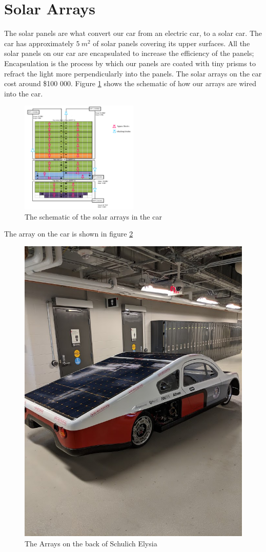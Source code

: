 \documentclass[titlepage]{article}
\begin{document}
    \section{Solar Arrays}
    The solar panels are what convert our car from an electric car, to a
    solar car. The car has approximately $5\ m^2$ of solar panels
    covering its upper surfaces. All the solar panels on our car are
    encapsulated to increase the efficiency of the panels; Encapsulation
    is the process by which our panels are coated with tiny prisms to
    refract the light more perpendicularly into the panels. The solar
    arrays on the car cost around \$100 000. Figure \ref{fig:arr_schem}
    shows the schematic of how our arrays are wired into the car.
    \begin{figure}[H]
        \centering
        \includegraphics[width=0.5\textwidth]{images/array_schem.png}
        \caption{The schematic of the solar arrays in the car}
        \label{fig:arr_schem}
    \end{figure}
    \noindent The array on the car is shown in figure \ref{fig:array}
    \begin{figure}[H]
        \centering
        \includegraphics[width=\textwidth]{images/array.jpg}
        \caption{The Arrays on the back of Schulich Elysia}
        \label{fig:array}
    \end{figure}
\end{document}
